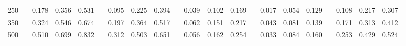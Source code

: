 % 
\begin{tabular}{ccccccccccccccccccccc}
  \hline
  \hline
250 &  & 0.178 & 0.356 & 0.531 &  & 0.095 & 0.225 & 0.394 &  & 0.039 & 0.102 & 0.169 &  & 0.017 & 0.054 & 0.129 &  & 0.108 & 0.217 & 0.307 \\ 
  350 &  & 0.324 & 0.546 & 0.674 &  & 0.197 & 0.364 & 0.517 &  & 0.062 & 0.151 & 0.217 &  & 0.043 & 0.081 & 0.139 &  & 0.171 & 0.313 & 0.412 \\ 
  500 &  & 0.510 & 0.699 & 0.832 &  & 0.312 & 0.503 & 0.651 &  & 0.056 & 0.162 & 0.254 &  & 0.033 & 0.084 & 0.160 &  & 0.253 & 0.429 & 0.524 \\ 
   \hline
\end{tabular}

